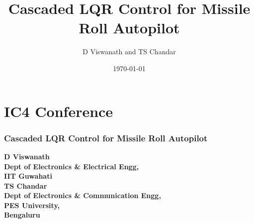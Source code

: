 \documentclass[10pt]{beamer}
\title { Cascaded LQR Control for Missile Roll Autopilot}
\author{D Viswanath and TS Chandar}
\date{\today}
\begin{document}
\section{IC4 Conference}

\begin{frame}
\frametitle{\textbf{Cascaded LQR Control for Missile Roll Autopilot}}
\begin{center}
\vspace{0.5cm}
{\small{\sf \sf \textbf{D Viswanath}}}\\[0.5ex]
{\small{\sf \sf \textbf{\color{gray}Dept of Electronics \& Electrical Engg,\\IIT Guwahati}}}\\[0.5ex]
\vspace{.5cm}
{\small{\sf \sf \textbf{TS Chandar}}}\\
{\small{\sf \sf \textbf{\color{gray}Dept of Electronics \& Communication Engg, \\PES University,\\Bengaluru}}}\\[0.5ex]
\vspace{-.5cm}
\end{center}
\end{frame}
\end{document}

